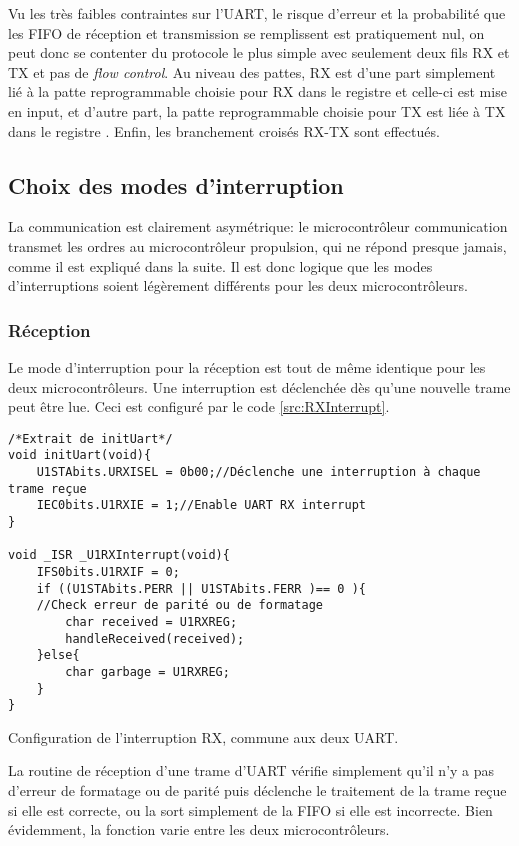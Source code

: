 Vu les très faibles contraintes sur l'UART, le risque d'erreur et la probabilité que les FIFO de réception et transmission se remplissent est pratiquement nul, on peut donc se contenter du protocole le plus simple avec seulement deux fils RX et TX et pas de \emph{flow control}. Au niveau des pattes, RX est d'une part simplement lié à la patte reprogrammable choisie pour RX dans le registre  et celle-ci est mise en input, et d'autre part, la patte reprogrammable choisie pour TX est liée à TX dans le registre . Enfin, les branchement croisés RX-TX sont effectués.

\subsection{Choix des modes d'interruption}
La communication est clairement asymétrique: le microcontrôleur communication transmet les ordres au microcontrôleur propulsion, qui ne répond presque jamais, comme il est expliqué dans la suite. Il est donc logique que les modes d'interruptions soient légèrement différents pour les deux microcontrôleurs.

\subsubsection{Réception}
Le mode d'interruption pour la réception est tout de même identique pour les deux microcontrôleurs. Une interruption est déclenchée dès qu'une nouvelle trame peut être lue. Ceci est configuré par le code \ref{src:RXInterrupt}.
\begin{listing}[htbp]
\begin{verbatim}
/*Extrait de initUart*/
void initUart(void){
    U1STAbits.URXISEL = 0b00;//Déclenche une interruption à chaque trame reçue
    IEC0bits.U1RXIE = 1;//Enable UART RX interrupt
}

void _ISR _U1RXInterrupt(void){
    IFS0bits.U1RXIF = 0;
    if ((U1STAbits.PERR || U1STAbits.FERR )== 0 ){
    //Check erreur de parité ou de formatage
        char received = U1RXREG;
        handleReceived(received);
    }else{
        char garbage = U1RXREG;
    }
}
\end{verbatim}
\caption{Configuration de l'interruption RX, commune aux deux UART.\label{src:RXInterrupt}}
\end{listing}

La routine de réception d'une trame d'UART vérifie simplement qu'il n'y a pas d'erreur de formatage ou de parité puis déclenche le traitement de la trame reçue si elle est correcte, ou la sort simplement de la FIFO si elle est incorrecte. Bien évidemment, la fonction  varie entre les deux microcontrôleurs.

